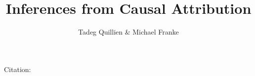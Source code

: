 \documentclass[fleqn,reqno,10pt]{article}
\title{Inferences from Causal Attribution}
\author{Tadeg Quillien \& Michael Franke}
\date{}
\begin{document}
\maketitle

Citation: \citep{QuillienLucas2023:Counterfactuals}

\printbibliography[heading=bibintoc]
\end{document}
